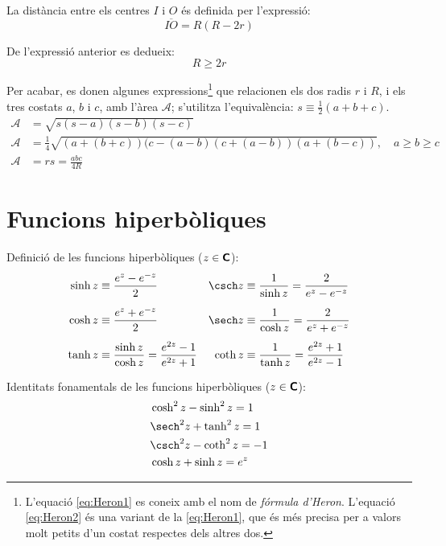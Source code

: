La distància entre els centres $I$ i $O$ és definida per l'expressió:
\begin{equation}
	\overline{IO} = R(R-2r)
\end{equation}

De l'expressió anterior es dedueix:
\begin{equation}
	R  \geq 2r
\end{equation}

Per acabar, es donen algunes expressions\footnote{L'equació \eqref{eq:Heron1} es coneix amb el nom de \emph{fórmula d'Heron}. L'equació \eqref{eq:Heron2} és una variant  de la \eqref{eq:Heron1}, que és més precisa per a valors molt petits d'un costat respectes dels altres dos.} que relacionen els dos radis $r$ i $R$, i els tres costats $a$, $b$ i $c$,  amb l'àrea $\mathscr{A}$; s'utilitza l'equivalència: $s \equiv \frac{1}{2}(a+b+c)$.
\begin{align}
	\mathscr{A} &= \sqrt{s (s-a) (s-b) (s-c)} \label{eq:Heron1} \\
	\mathscr{A} &=\frac{1}{4} \sqrt{(a+(b+c)) (c-(a-b) (c+(a-b)) (a+(b-c))}, \quad a \geq b\geq c \label{eq:Heron2}\\
	\mathscr{A} &= r s =   \frac{a b c}{4R} 
\end{align}



\section{Funcions hiperbòliques}

Definició de les funcions hiperbòliques ($z\in{\ensuremath{\boldsymbol{\mathsf{C}}}}$):
\begin{subequations}
\begin{align}
    \sinh z&\equiv \frac{e^z - e^{-z}}{2} & \csch z &\equiv\frac{1}{\sinh z} =
    \frac{2}{e^z - e^{-z}}\\[1ex]
    \cosh z&\equiv \frac{e^z + e^{-z}}{2} & \sech z &\equiv\frac{1}{\cosh z} =
    \frac{2}{e^z + e^{-z}}\\[1ex]
    \tanh z&\equiv \frac{\sinh z}{\cosh z} = \frac{e^{2z}-1}{e^{2z}+1} &
    \coth z &\equiv\frac{1}{\tanh z} = \frac{e^{2z}+1}{e^{2z}-1}
\end{align}
\end{subequations}

Identitats fonamentals de les funcions hiperbòliques
($z\in{\ensuremath{\boldsymbol{\mathsf{C}}}}$):
\begin{align}
    &\cosh^2 z - \sinh^2 z = 1 \\
    &\sech^2 z + \tanh^2 z = 1 \\
    &\csch^2 z - \coth^2 z = -1 \\
    &\cosh z + \sinh z = e^z
\end{align}

